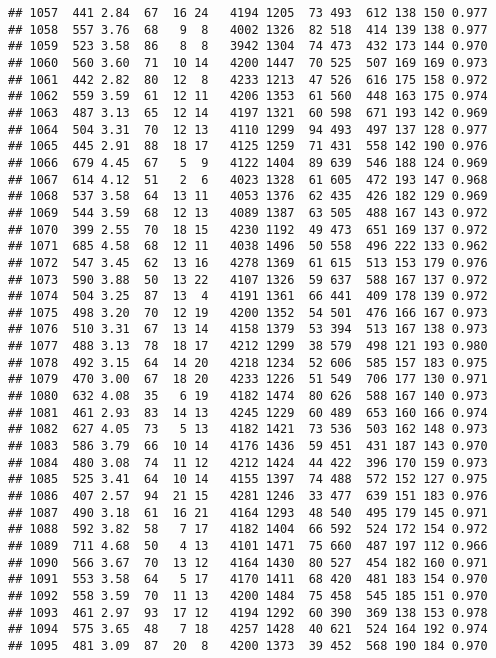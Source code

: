 \documentclass[]{article}
\begin{document}
\begin{verbatim}
## 1057  441 2.84  67  16 24   4194 1205  73 493  612 138 150 0.977
## 1058  557 3.76  68   9  8   4002 1326  82 518  414 139 138 0.977
## 1059  523 3.58  86   8  8   3942 1304  74 473  432 173 144 0.970
## 1060  560 3.60  71  10 14   4200 1447  70 525  507 169 169 0.973
## 1061  442 2.82  80  12  8   4233 1213  47 526  616 175 158 0.972
## 1062  559 3.59  61  12 11   4206 1353  61 560  448 163 175 0.974
## 1063  487 3.13  65  12 14   4197 1321  60 598  671 193 142 0.969
## 1064  504 3.31  70  12 13   4110 1299  94 493  497 137 128 0.977
## 1065  445 2.91  88  18 17   4125 1259  71 431  558 142 190 0.976
## 1066  679 4.45  67   5  9   4122 1404  89 639  546 188 124 0.969
## 1067  614 4.12  51   2  6   4023 1328  61 605  472 193 147 0.968
## 1068  537 3.58  64  13 11   4053 1376  62 435  426 182 129 0.969
## 1069  544 3.59  68  12 13   4089 1387  63 505  488 167 143 0.972
## 1070  399 2.55  70  18 15   4230 1192  49 473  651 169 137 0.972
## 1071  685 4.58  68  12 11   4038 1496  50 558  496 222 133 0.962
## 1072  547 3.45  62  13 16   4278 1369  61 615  513 153 179 0.976
## 1073  590 3.88  50  13 22   4107 1326  59 637  588 167 137 0.972
## 1074  504 3.25  87  13  4   4191 1361  66 441  409 178 139 0.972
## 1075  498 3.20  70  12 19   4200 1352  54 501  476 166 167 0.973
## 1076  510 3.31  67  13 14   4158 1379  53 394  513 167 138 0.973
## 1077  488 3.13  78  18 17   4212 1299  38 579  498 121 193 0.980
## 1078  492 3.15  64  14 20   4218 1234  52 606  585 157 183 0.975
## 1079  470 3.00  67  18 20   4233 1226  51 549  706 177 130 0.971
## 1080  632 4.08  35   6 19   4182 1474  80 626  588 167 140 0.973
## 1081  461 2.93  83  14 13   4245 1229  60 489  653 160 166 0.974
## 1082  627 4.05  73   5 13   4182 1421  73 536  503 162 148 0.973
## 1083  586 3.79  66  10 14   4176 1436  59 451  431 187 143 0.970
## 1084  480 3.08  74  11 12   4212 1424  44 422  396 170 159 0.973
## 1085  525 3.41  64  10 14   4155 1397  74 488  572 152 127 0.975
## 1086  407 2.57  94  21 15   4281 1246  33 477  639 151 183 0.976
## 1087  490 3.18  61  16 21   4164 1293  48 540  495 179 145 0.971
## 1088  592 3.82  58   7 17   4182 1404  66 592  524 172 154 0.972
## 1089  711 4.68  50   4 13   4101 1471  75 660  487 197 112 0.966
## 1090  566 3.67  70  13 12   4164 1430  80 527  454 182 160 0.971
## 1091  553 3.58  64   5 17   4170 1411  68 420  481 183 154 0.970
## 1092  558 3.59  70  11 13   4200 1484  75 458  545 185 151 0.970
## 1093  461 2.97  93  17 12   4194 1292  60 390  369 138 153 0.978
## 1094  575 3.65  48   7 18   4257 1428  40 621  524 164 192 0.974
## 1095  481 3.09  87  20  8   4200 1373  39 452  568 190 184 0.970

\end{verbatim}
\end{document}
